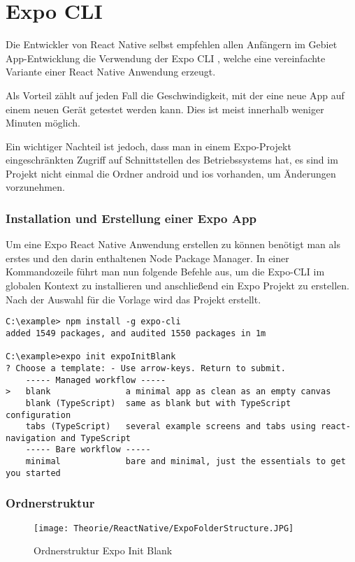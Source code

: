 \section{Expo CLI}
\label{expocli}
Die Entwickler von React Native selbst empfehlen allen Anfängern im Gebiet App-Entwicklung die
Verwendung der Expo CLI \cite{expocli}, welche eine vereinfachte Variante einer React Native Anwendung erzeugt.

Als Vorteil zählt auf jeden Fall die Geschwindigkeit, mit der eine neue App auf einem neuen Gerät
getestet werden kann. Dies ist meist innerhalb weniger Minuten möglich.

Ein wichtiger Nachteil ist jedoch, dass man in einem Expo-Projekt eingeschränkten Zugriff auf
Schnittstellen des Betriebssystems hat, es sind im Projekt nicht einmal die Ordner android und ios
vorhanden, um Änderungen vorzunehmen.

\subsubsection{Installation und Erstellung einer Expo App}
Um eine Expo React Native Anwendung erstellen zu können benötigt man als erstes  und
den darin enthaltenen Node Package Manager. In einer Kommandozeile führt man nun folgende Befehle
aus, um die Expo-CLI im globalen Kontext zu installieren und anschließend ein Expo Projekt zu
erstellen. Nach der Auswahl für die Vorlage wird das Projekt erstellt.

\begin{lstlisting}
C:\example> npm install -g expo-cli
added 1549 packages, and audited 1550 packages in 1m

C:\example>expo init expoInitBlank
? Choose a template: - Use arrow-keys. Return to submit.
    ----- Managed workflow -----
>   blank               a minimal app as clean as an empty canvas
    blank (TypeScript)  same as blank but with TypeScript configuration
    tabs (TypeScript)   several example screens and tabs using react-navigation and TypeScript
    ----- Bare workflow -----
    minimal             bare and minimal, just the essentials to get you started
\end{lstlisting}

\subsubsection{Ordnerstruktur}
\begin{figure}[H]
  \begin{center}
    \texttt{[image: Theorie/ReactNative/ExpoFolderStructure.JPG]}
    \caption{Ordnerstruktur Expo Init Blank}
  \end{center}
\end{figure}

